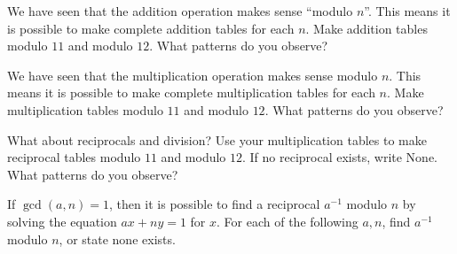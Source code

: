 \documentclass[12pt]{exam}
\begin{document}
\begin{questions}
  \question We have seen that the addition operation makes sense ``modulo $n$''. This means it is possible to make complete addition tables for each $n$. Make addition tables modulo $11$ and modulo $12$. What patterns do you observe?
  \begin{center}

  \end{center}
  \newpage
  \question We have seen that the multiplication operation makes sense modulo $n$. This means it is possible to make complete multiplication tables for each $n$. Make multiplication tables modulo $11$ and modulo $12$. What patterns do you observe?
  \begin{center}

  \end{center}
  \newpage
  \question What about reciprocals and division? Use your multiplication tables to make reciprocal tables modulo $11$ and modulo $12$. If no reciprocal exists, write None. What patterns do you observe?
  \begin{center}
    \qquad\qquad
  \end{center}
  \newpage
  \question If $\gcd(a,n)=1$, then it is possible to find a reciprocal $a^{-1}$ modulo $n$ by solving the equation $ax+ny=1$ for $x$. For each of the following $a,n$, find $a^{-1}$ modulo $n$, or state none exists.
  \begin{parts}

\end{parts}
\end{questions}
\end{document}
